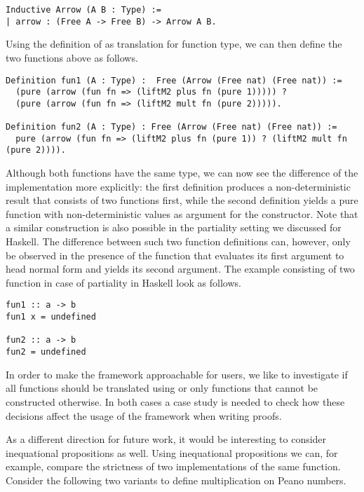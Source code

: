 {\begin{verbatim}
Inductive Arrow (A B : Type) :=
| arrow : (Free A -> Free B) -> Arrow A B.
\end{verbatim}

Using the definition of  as translation for function type, we can then define the two functions above as follows.

\begin{verbatim}
Definition fun1 (A : Type) :  Free (Arrow (Free nat) (Free nat)) :=
  (pure (arrow (fun fn => (liftM2 plus fn (pure 1))))) ?
  (pure (arrow (fun fn => (liftM2 mult fn (pure 2))))).

Definition fun2 (A : Type) : Free (Arrow (Free nat) (Free nat)) :=
  pure (arrow (fun fn => (liftM2 plus fn (pure 1)) ? (liftM2 mult fn (pure 2)))).
\end{verbatim}

Although both functions have the same type, we can now see the difference of the implementation more explicitly: the first definition produces a non-deterministic result that consists of two functions first, while the second definition yields a pure function with non-deterministic values as argument for the  constructor.
Note that a similar construction is also possible in the partiality setting we discussed for Haskell.
The difference between such two function definitions can, however, only be observed in the presence of the function  that evaluates its first argument to head normal form and yields its second argument.
The example consisting of two function in case of partiality in Haskell look as follows.

\begin{verbatim}
fun1 :: a -> b
fun1 x = undefined

fun2 :: a -> b
fun2 = undefined
\end{verbatim}

In order to make the framework approachable for users, we like to investigate if all functions should be translated using  or only functions that cannot be constructed otherwise.
In both cases a case study is needed to check how these decisions affect the usage of the framework when writing proofs.

As a different direction for future work, it would be interesting to consider inequational propositions as well.
Using inequational propositions we can, for example, compare the strictness of two implementations of the same function.
Consider the following two variants to define multiplication on Peano numbers.

}
